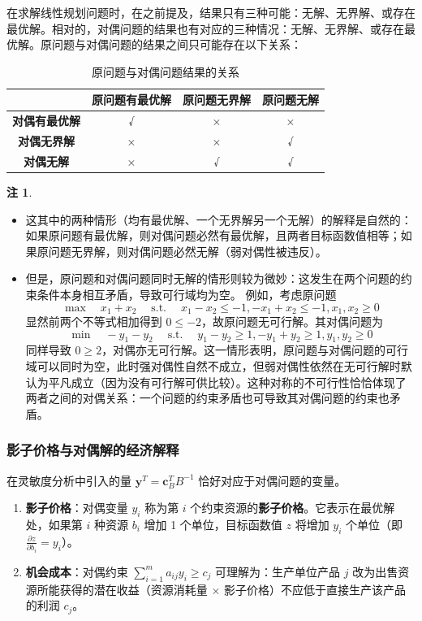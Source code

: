 \documentclass[12pt]{article}
\theoremstyle{plain}
\theoremstyle{definition}
\newtheorem{rmk}{注}[subsection]
\newcommand{\st}{\mathrel{\text{s.t.}}}
\begin{document}
在求解线性规划问题时，在之前提及，结果只有三种可能：无解、无界解、或存在最优解。相对的，对偶问题的结果也有对应的三种情况：无解、无界解、或存在最优解。原问题与对偶问题的结果之间只可能存在以下关系：
\begin{table}[!htbp]
    \centering
    \caption{原问题与对偶问题结果的关系}\label{tab:duality_relationship}
    \renewcommand\arraystretch{1.3}
    \begin{tabular}{c|c|c|c}
        \toprule
        & \textbf{原问题有最优解} & \textbf{原问题无界解} & \textbf{原问题无解} \\
        \midrule
        \textbf{对偶有最优解} & √ & × & × \\
        \textbf{对偶无界解} & × & × & √ \\
        \textbf{对偶无解} & × & √ & √ \\
        \bottomrule
    \end{tabular}
\end{table}
\begin{rmk}
    \begin{itemize}
        \item 这其中的两种情形（均有最优解、一个无界解另一个无解）的解释是自然的：如果原问题有最优解，则对偶问题必然有最优解，且两者目标函数值相等；如果原问题无界解，则对偶问题必然无解（弱对偶性被违反）。
        \item 但是，原问题和对偶问题同时无解的情形则较为微妙：这发生在两个问题的约束条件本身相互矛盾，导致可行域均为空。
        例如，考虑原问题 
        \[ \max \quad x_1 + x_2 \quad \st \quad x_1 - x_2 \le -1, -x_1 + x_2 \le -1, x_1, x_2 \ge 0 \]
        显然前两个不等式相加得到 $0 \le -2$，故原问题无可行解。其对偶问题为 
        \[ \min \quad -y_1 - y_2 \quad \st \quad y_1 - y_2 \ge 1, -y_1 + y_2 \ge 1, y_1, y_2 \ge 0 \]
        同样导致 $0 \ge 2$，对偶亦无可行解。这一情形表明，原问题与对偶问题的可行域可以同时为空，此时强对偶性自然不成立，但弱对偶性依然在无可行解时默认为平凡成立（因为没有可行解可供比较）。这种对称的不可行性恰恰体现了两者之间的对偶关系：一个问题的约束矛盾也可导致其对偶问题的约束也矛盾。
    \end{itemize}
\end{rmk}

\subsubsection{影子价格与对偶解的经济解释}\label{subsubsec:shadow_price}

在灵敏度分析中引入的量 $\bm{y}^T = \bm{c}_B^T B^{-1}$ 恰好对应于对偶问题的变量。
\begin{enumerate}
    \item \textbf{影子价格}：对偶变量 $y_i$ 称为第 $i$ 个约束资源的\textbf{影子价格}。它表示在最优解处，如果第 $i$ 种资源 $b_i$ 增加 1 个单位，目标函数值 $z$ 将增加 $y_i$ 个单位（即 $\frac{\partial z}{\partial b_i} = y_i$）。
    \item \textbf{机会成本}：对偶约束 $\sum_{i=1}^m a_{ij} y_i \geq c_j$ 可理解为：生产单位产品 $j$ 改为出售资源所能获得的潜在收益（资源消耗量 $\times$ 影子价格）不应低于直接生产该产品的利润 $c_j$。
\end{enumerate}
\end{document}
